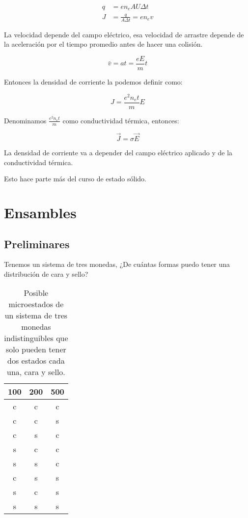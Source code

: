 \documentclass[11pt,fleqn]{book}
\begin{document}
\begin{equation}
    \begin{split}
        q&=en_{e}AU\Delta t\\
        J&=\frac{q}{A\Delta t}=en_{e}v
    \end{split}
    \label{Eq. 1.38}
\end{equation}

La velocidad depende del campo eléctrico, esa velocidad de arrastre depende de la aceleración por el tiempo promedio antes de hacer una colisión. 

\begin{equation}
    \bar{v}=at=\frac{eE}{m}t
    \label{Eq. 1.39}
\end{equation}

Entonces la densidad de corriente la podemos definir como:

\begin{equation*}
    J=\frac{e^{2}n_{e}t}{m}E
\end{equation*}

Denominamos $\frac{e^{2}n_{e}t}{m}$ como conductividad térmica, entonces:

\begin{equation}
    \Vec{J}=\sigma\Vec{E}
    \label{Eq. 1.40}
\end{equation}

La densidad de corriente va a depender del campo eléctrico aplicado y de la conductividad térmica.

Esto hace parte más del curso de estado sólido.


\chapter{Ensambles}

\section{Preliminares}

Tenemos un sistema de tres monedas, ¿De cuántas formas puedo tener una distribución de cara y sello?

\begin{table}[H]
    \centering
    \begin{tabular}{c c c }
    \hline\hline
    100   & 200 & 500 \\\hline
    c     & c   & c\\
    c     & c   & s\\
    c     & s   & c\\
    s     & c   & c\\
    s     & s   & c\\
    c     & s   & s\\
    s     & c   & s\\
    s     & s   & s\\
    \end{tabular}
    \caption{Posible microestados de un sistema de tres monedas indistinguibles que solo pueden tener dos estados cada una, cara y sello.}
    \label{Tab. 1}
\end{table}
\end{document}

